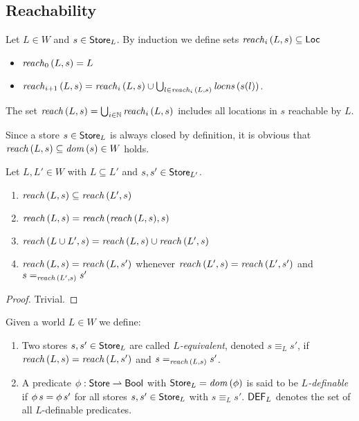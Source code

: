\documentclass[12pt,a4paper]{report}
\newcommand{\DEF}{\sstyle{DEF}}
\begin{document}

\subsection{Reachability}

\begin{definition}[Reachability]
  Let $L\in W$ and $s\in\mathsf{Store}_L$. By induction we define sets $\mathit{reach}_{i}\,(L,s) \subseteq \mathsf{Loc}$
  \begin{itemize}
    \item $\mathit{reach}_{0}\,(L,s) = L$
    \item $\mathit{reach}_{i+1}\,(L,s) = \mathit{reach}_{i}\,(L,s) \cup \bigcup_{l\in\mathit{reach}_{i}\,(L,s)} \mathit{locns}\,(s(l))$.
  \end{itemize}
  The set $\mathit{reach}\,(L,s) = \bigcup_{i\in\mathbb N} \mathit{reach}_{i}\,(L,s)$ includes all locations in $s$ reachable
  by $L$.
\end{definition}

Since a store $s\in\mathsf{Store}_L$ is always closed by definition, it is obvious that
$\mathit{reach}\,(L,s) \subseteq \mathit{dom}\,(s) \in  W$ holds.

\begin{lemma}[Reachability] \label{lemma:Reachability}
  Let $L,L'\in W$ with $L \subseteq L'$ and $s,s'\in\mathsf{Store}_{L'}$.
  \begin{enumerate}
    \item $\mathit{reach}\,(L,s) \subseteq \mathit{reach}\,(L',s)$
    \item $\mathit{reach}\,(L,s) = \mathit{reach}\,(\mathit{reach}\,(L,s),s)$
    \item $\mathit{reach}\,(L \cup L',s) = \mathit{reach}\,(L,s) \cup \mathit{reach}\,(L',s)$
    \item $\mathit{reach}\,(L,s) = \mathit{reach}\,(L,s')$ whenever $\mathit{reach}\,(L',s) = \mathit{reach}\,(L',s')$
          and $s =_{\mathit{reach}\,(L',s)} s'$
  \end{enumerate}
\end{lemma}

\begin{proof}
  Trivial.
\end{proof}

\begin{definition}
  Given a world $L \in W$ we define:
  \begin{enumerate}
    \item Two stores $s,s'\in\mathsf{Store}_L$ are called {\em $L$-equivalent}, denoted $s \equiv_L s'$, if
          $\mathit{reach}\,(L,s) = \mathit{reach}\,(L,s')$ and $s =_{\mathit{reach}\,(L,s)} s'$.

    \item A predicate $\phi:\mathsf{Store} \rightharpoonup \mathsf{Bool}$ with $\mathsf{Store}_L = \mathit{dom}\,(\phi)$ is said to be
          {\em $L$-definable} if $\phi\,s = \phi\,s'$ for all stores
          $s,s'\in\mathsf{Store}_L$ with $s \equiv_L s'$. $\DEF_L$ denotes the set of all $L$-definable
          predicates.
  \end{enumerate}
\end{definition}
\end{document}
